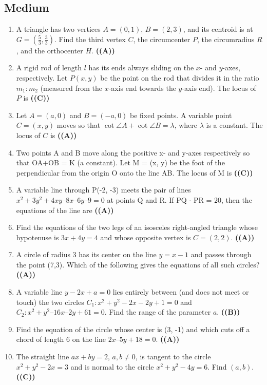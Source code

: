 \documentclass{article}
\begin{document}
\subsection{Medium}
\begin{enumerate}
\item A triangle has two vertices $A = (0, 1)$, $B = (2, 3)$, and its centroid is at $G = (\frac{5}{3},\frac{3}{3})$. Find the third vertex $C$, the circumcenter $P$, the circumradius $R$, and the orthocenter $H$. \hfill \textbf{((A))}
\item A rigid rod of length $l$ has its ends always sliding on the $x$- and $y$-axes, respectively. Let $P(x, y)$ be the point on the rod that divides it in the ratio $m_1 : m_2$ (measured from the $x$-axis end towards the $y$-axis end). The locus of $P$ is \hfill \textbf{((C))}
\item Let $A = (a,0)$ and $B = (-a, 0)$ be fixed points. A variable point $C = (x, y)$ moves so that $\cot \angle A + \cot \angle B = \lambda$, where $\lambda$ is a constant. The locus of $C$ is \hfill \textbf{((A))}
\item Two points A and B move along the positive x- and y-axes respectively so that OA+OB = K (a constant). Let M = (x, y) be the foot of the perpendicular from the origin O onto the line AB. The locus of M is \hfill \textbf{((C))}
\item A variable line through P(-2, -3) meets the pair of lines $x^2 + 3y^2 + 4xy – 8x – 6y – 9 =0$ at points Q and R. If PQ $\cdot$ PR = 20, then the equations of the line are \hfill \textbf{((A))}
\item Find the equations of the two legs of an isosceles right-angled triangle whose hypotenuse is $3x + 4y = 4$ and whose opposite vertex is $C = (2, 2)$. \hfill \textbf{((A))}
\item A circle of radius 3 has its center on the line $y = x - 1$ and passes through the point (7,3). Which of the following gives the equations of all such circles? \hfill \textbf{((A))}
\item A variable line $y - 2x + a = 0$ lies entirely between (and does not meet or touch) the two circles $C_1: x^2 + y^2 - 2x - 2y + 1 = 0$ and $C_2: x^2 + y^2 – 16x – 2y + 61 = 0$. Find the range of the parameter $a$. \hfill \textbf{((B))}
\item Find the equation of the circle whose center is (3, -1) and which cuts off a chord of length 6 on the line $2x – 5y + 18 = 0$. \hfill \textbf{((A))}
\item The straight line $ax + by = 2$, $a, b \neq 0$, is tangent to the circle $x^2 + y^2 - 2x = 3$ and is normal to the circle $x^2 + y^2 - 4y = 6$. Find $(a, b)$. \hfill \textbf{((C))}

\end{enumerate}
\end{document}
